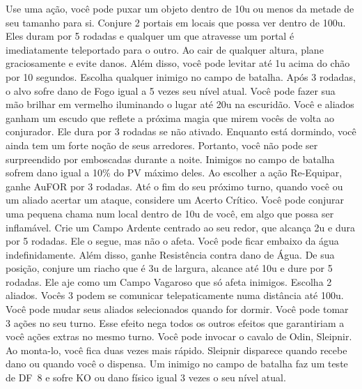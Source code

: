%
\vfill
%
{Use uma ação, você pode puxar um objeto dentro de 10u ou menos da metade de seu tamanho para si.}
{Conjure 2 portais em locais que possa ver dentro de 100u. Eles duram por 5 rodadas e qualquer um que atravesse um portal é imediatamente teleportado para o outro.}
%
\vfill
%
{Ao cair de qualquer altura, plane graciosamente e evite danos. Além disso, você pode levitar até 1u acima do chão por 10 segundos.}
{Escolha qualquer inimigo no campo de batalha. Após 3 rodadas, o alvo sofre dano de Fogo igual a 5 vezes seu nível atual.}
%
\vfill
%
{Você pode fazer sua mão brilhar em vermelho iluminando o lugar até 20u na escuridão.}
{Você e aliados ganham um escudo que reflete a próxima magia que mirem vocês de volta ao conjurador. Ele dura por 3 rodadas se não ativado.}
%
\vfill
%
{Enquanto está dormindo, você ainda tem um forte noção de seus arredores. Portanto, você não pode ser surpreendido por emboscadas durante a noite.}
{Inimigos no campo de batalha sofrem dano igual a 10\% do PV máximo deles.}
%
\vfill
%
{Ao escolher a ação Re-Equipar, ganhe AuFOR por 3 rodadas.}
{Até o fim do seu próximo turno, quando você ou um aliado acertar um ataque, considere um Acerto Crítico.}
%
\vfill
%
{Você pode conjurar uma pequena chama num local dentro de 10u de você, em algo que possa ser inflamável.}
{Crie um Campo Ardente centrado ao seu redor, que alcança 2u e dura por 5 rodadas. Ele o segue, mas não o afeta.}
%
\vfill
%
{Você pode ficar embaixo da água indefinidamente. Além disso, ganhe Resistência contra dano de Água.}
{De sua posição, conjure um riacho que é 3u de largura, alcance até 10u e dure por 5 rodadas. Ele aje como um Campo Vagaroso que só afeta inimigos.}
%
\vfill
%
{Escolha 2 aliados. Vocês 3 podem se comunicar telepaticamente numa distância até 100u. Você pode mudar seus aliados selecionados quando for dormir.}
{Você pode tomar 3 ações no seu turno. Esse efeito nega todos os outros efeitos que garantiriam a você ações extras no mesmo turno.}
%
\vfill
%
{Você pode invocar o cavalo de Odin, Sleipnir. Ao monta-lo, você fica duas vezes mais rápido. Sleipnir disparece quando recebe dano ou quando você o dispensa.}
{Um inimigo no campo de batalha faz um teste de DF~8 e sofre KO ou dano físico igual 3 vezes o seu nível atual.}
